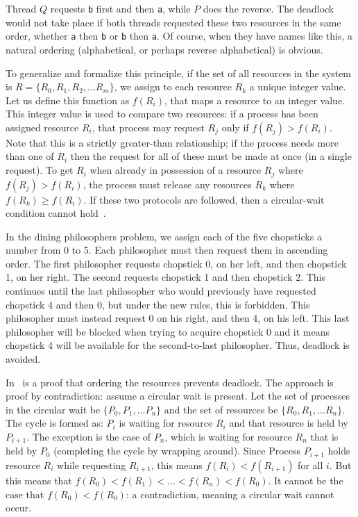 Thread $Q$ requests \texttt{b} first and then \texttt{a}, while $P$ does the reverse. The deadlock would not take place if both threads requested these two resources in the same order, whether \texttt{a} then \texttt{b} or \texttt{b} then \texttt{a}. Of course, when they have names like this, a natural ordering (alphabetical, or perhaps reverse alphabetical) is obvious. 

To generalize and formalize this principle, if the set of all resources in the system is $R = \{R_{0}, R_{1}, R_{2}, ... R_{m}\}$, we assign to each resource $R_{k}$ a unique integer value. Let us define this function as $f(R_{i})$, that maps a resource to an integer value. This integer value is used to compare two resources: if a process has been assigned resource $R_{i}$, that process may request $R_{j}$ only if $f(R_{j}) > f(R_{i})$. Note that this is a strictly greater-than relationship; if the process needs more than one of $R_{i}$ then the request for all of these must be made at once (in a single request). To get $R_{i}$ when already in possession of a resource $R_{j}$ where $f(R_{j}) > f(R_{i})$, the process must release any resources $R_{k}$ where $f(R_{k}) \geq f(R_{i})$. If these two protocols are followed, then a circular-wait condition cannot hold~\cite{osc}.

In the dining philosophers problem, we assign each of the five chopsticks a number from 0 to 5. Each philosopher must then request them in ascending order. The first philosopher requests chopstick 0, on her left, and then chopstick 1, on her right. The second requests chopstick 1 and then chopstick 2. This continues until the last philosopher who would previously have requested chopstick 4 and then 0, but under the new rules, this is forbidden. This philosopher must instead request 0 on his right, and then 4, on his left. This last philosopher will be blocked when trying to acquire chopstick 0 and it means chopstick 4 will be available for the second-to-last philosopher. Thus, deadlock is avoided.

In~\cite{osc} is a proof that ordering the resources prevents deadlock. The approach is proof by contradiction: assume a circular wait is present. Let the set of processes in the circular wait be $\{P_{0}, P_{1}, ... P_{n}\}$ and the set of resources be $\{R_{0}, R_{1}, ... R_{n}\}$. The cycle is formed as: $P_{i}$ is waiting for resource $R_{i}$ and that resource is held by $P_{i+1}$. The exception is the case of $P_{n}$, which is waiting for resource $R_{n}$ that is held by $P_{0}$ (completing the cycle by wrapping around). Since Process $P_{i+1}$ holds resource $R_{i}$ while requesting $R_{i+1}$, this means $f(R_{i}) < f(R_{i+1})$ for all $i$. But this means that $f(R_{0}) < f(R_{1}) < ... < f(R_{n}) < f(R_{0})$. It cannot be the case that $f(R_{0}) < f(R_{0})$: a contradiction, meaning a circular wait cannot occur.

